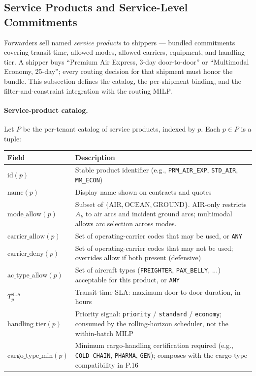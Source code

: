 \documentclass[11pt,a4paper]{article}
\theoremstyle{definition}
\begin{document}
\subsection{Service Products and Service-Level Commitments}
\label{sec:service-products}

Forwarders sell named \emph{service products} to shippers --- bundled commitments
covering transit-time, allowed modes, allowed carriers, equipment, and handling
tier. A shipper buys ``Premium Air Express, 3-day door-to-door'' or ``Multimodal
Economy, 25-day''; every routing decision for that shipment must honor the bundle.
This subsection defines the catalog, the per-shipment binding, and the
filter-and-constraint integration with the routing MILP.

\paragraph{Service-product catalog.}
Let $P$ be the per-tenant catalog of service products, indexed by $p$. Each
$p \in P$ is a tuple:
\begin{center}
\begin{tabular}{lp{9.5cm}}
\toprule
Field & Description \\
\midrule
$\text{id}(p)$ & Stable product identifier (e.g., \texttt{PRM\_AIR\_EXP}, \texttt{STD\_AIR}, \texttt{MM\_ECON}) \\
$\text{name}(p)$ & Display name shown on contracts and quotes \\
$\text{mode\_allow}(p)$ & Subset of $\{\text{AIR}, \text{OCEAN}, \text{GROUND}\}$. AIR-only restricts $A_k$ to air arcs and incident ground arcs; multimodal allows arc selection across modes. \\
$\text{carrier\_allow}(p)$ & Set of operating-carrier codes that may be used, or \texttt{ANY} \\
$\text{carrier\_deny}(p)$ & Set of operating-carrier codes that may not be used; overrides allow if both present (defensive) \\
$\text{ac\_type\_allow}(p)$ & Set of aircraft types (\texttt{FREIGHTER}, \texttt{PAX\_BELLY}, ...) acceptable for this product, or \texttt{ANY} \\
$T_p^{\text{SLA}}$ & Transit-time SLA: maximum door-to-door duration, in hours \\
$\text{handling\_tier}(p)$ & Priority signal: \texttt{priority} / \texttt{standard} / \texttt{economy}; consumed by the rolling-horizon scheduler, not the within-batch MILP \\
$\text{cargo\_type\_min}(p)$ & Minimum cargo-handling certification required (e.g., \texttt{COLD\_CHAIN}, \texttt{PHARMA}, \texttt{GEN}); composes with the cargo-type compatibility in P.16 \\
\bottomrule
\end{tabular}
\end{center}
\end{document}
